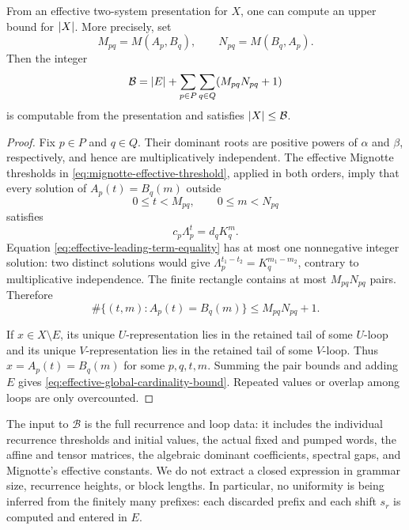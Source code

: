 \begin{theorem}
  \label{thm:effective-slender-cfl-cardinality}
  From an effective two-system presentation for \(X\), one can compute an
  upper bound for \(\lvert X \rvert\). More precisely, set
  \[
    M_{pq}=M(A_p,B_q),\qquad N_{pq}=M(B_q,A_p).
  \]
  Then the integer
  \begin{equation}
    \mathcal B=\lvert E \rvert+
      \sum_{p\in P}\sum_{q\in Q}(M_{pq}N_{pq}+1)
    \label{eq:effective-global-cardinality-bound}
  \end{equation}
  is computable from the presentation and satisfies \(\lvert X \rvert\le\mathcal B\).
\end{theorem}

\begin{proof}
  Fix \(p\in P\) and \(q\in Q\). Their dominant roots are positive powers
  of \(\alpha\) and \(\beta\), respectively, and hence are
  multiplicatively independent. The effective Mignotte thresholds in
  \eqref{eq:mignotte-effective-threshold}, applied in both orders, imply that
  every solution of \(A_p(t)=B_q(m)\) outside
  \[
    0\le t<M_{pq},\qquad 0\le m<N_{pq}
  \]
  satisfies
  \begin{equation}
    c_p\Lambda_p^t=d_qK_q^m.
    \label{eq:effective-leading-term-equality}
  \end{equation}
  Equation \eqref{eq:effective-leading-term-equality} has at most one
  nonnegative integer solution: two distinct solutions would give
  \(
    \Lambda_p^{t_1-t_2}=K_q^{m_1-m_2}
  \), contrary to multiplicative independence. The finite rectangle contains
  at most \(M_{pq}N_{pq}\) pairs. Therefore
  \[
    \#\{(t,m):A_p(t)=B_q(m)\}\le M_{pq}N_{pq}+1.
  \]

  If \(x\in X\setminus E\), its unique \(U\)-representation lies in the
  retained tail of some \(U\)-loop and its unique \(V\)-representation lies
  in the retained tail of some \(V\)-loop. Thus \(x=A_p(t)=B_q(m)\) for some
  \(p,q,t,m\). Summing the pair bounds and adding \(E\) gives
  \eqref{eq:effective-global-cardinality-bound}. Repeated values or overlap
  among loops are only overcounted.
\end{proof}

The input to \(\mathcal B\) is the full recurrence and loop data: it includes
the individual recurrence thresholds and initial values, the actual fixed
and pumped words, the affine and tensor matrices, the algebraic dominant
coefficients, spectral gaps, and Mignotte's effective constants. We do not
extract a closed expression in grammar size, recurrence heights, or block
lengths. In particular, no uniformity is being inferred from the finitely
many prefixes: each discarded prefix and each shift \(s_r\) is computed and
entered in \(E\).

